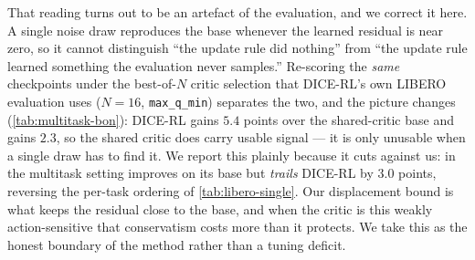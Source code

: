 That reading turns out to be an artefact of the evaluation, and we correct it
here. A single noise draw reproduces the base whenever the learned residual is
near zero, so it cannot distinguish ``the update rule did nothing'' from ``the
update rule learned something the evaluation never samples.'' Re-scoring the
\emph{same} checkpoints under the best-of-$N$ critic selection that DICE-RL's
own LIBERO evaluation uses ($N{=}16$, \texttt{max\_q\_min}) separates the two,
and the picture changes (\cref{tab:multitask-bon}): DICE-RL gains $5.4$ points
over the shared-critic base and \method{} gains $2.3$, so the shared critic
does carry usable signal --- it is only unusable when a single draw has to find
it. We report this plainly because it cuts against us: in the multitask setting
\method{} improves on its base but \emph{trails} DICE-RL by $3.0$ points,
reversing the per-task ordering of \cref{tab:libero-single}. Our displacement
bound is what keeps the residual close to the base, and when the critic is this
weakly action-sensitive that conservatism costs more than it protects. We take
this as the honest boundary of the method rather than a tuning deficit.

